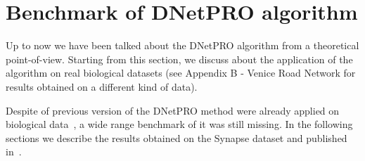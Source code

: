 \documentclass{standalone}
\begin{document}
\section[Benchmark]{Benchmark of DNetPRO algorithm}\label{synapse:benchmark}

Up to now we have been talked about the \textsf{DNetPRO} algorithm from a theoretical point-of-view.
Starting from this section, we discuss about the application of the algorithm on real biological datasets (see Appendix B - Venice Road Network for results obtained on a different kind of data).

Despite of previous version of the \textsf{DNetPRO} method were already applied on biological data~\cite{PMrna, Scotlandi2009, PMgene, Terragna}, a wide range benchmark of it was still missing.
In the following sections we describe the results obtained on the Synapse dataset and published in~\cite{Curti2019}.
\end{document}

